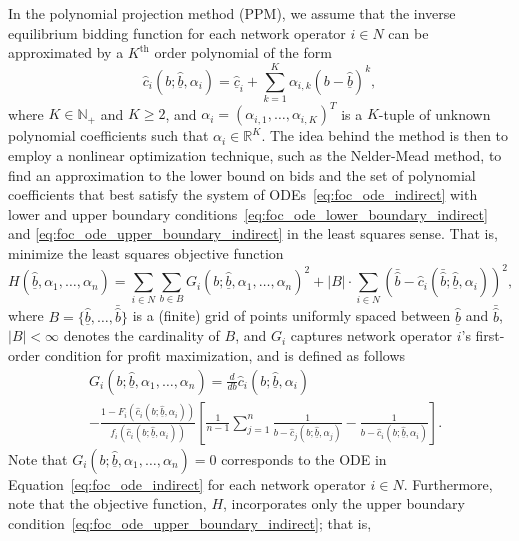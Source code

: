 In the polynomial projection method (PPM), we assume that the inverse equilibrium bidding function for each network operator $i\in N$ can be approximated by a $K^{\text{th}}$ order polynomial of the form
\begin{equation}
  \label{eq:polynomial_cost_function_indirect}
  \hat{c}_i(b;\underline{\hat{b}}, \alpha_i) = \underline{\hat{c}}_i + \sum_{k=1}^K \alpha_{i,k}(b - \underline{\hat{b}})^k,
\end{equation}
where $K\in\mathbb{N}_+$ and $K\geq 2$, and $\alpha_i = (\alpha_{i,1},\dotsc,\alpha_{i,K})^T$ is a $K$-tuple of unknown polynomial coefficients such that $\alpha_i\in\mathbb{R}^{K}$. The idea behind the method is then to employ a nonlinear optimization technique, such as the Nelder-Mead method, to find an approximation to the lower bound on bids and the set of polynomial coefficients that best satisfy the system of ODEs~\eqref{eq:foc_ode_indirect} with lower and upper boundary conditions~\eqref{eq:foc_ode_lower_boundary_indirect} and \eqref{eq:foc_ode_upper_boundary_indirect} in the least squares sense. That is, minimize the least squares objective function
\begin{equation}
  \label{eq:least_squares_objective_function_indirect}
  H(\underline{\hat{b}}, \alpha_1,\dotsc,\alpha_n) = \sum_{i\in N}\sum_{b\in B}G_i(b; \underline{\hat{b}}, \alpha_1,\dotsc, \alpha_n)^2 + |B|\cdot\sum_{i\in N} (\bar{\hat{b}} - \hat{c}_i(\bar{\hat{b}}; \underline{\hat{b}}, \alpha_i))^2,
\end{equation}
where $B=\{\underline{\hat{b}},\dotsc,\bar{\hat{b}}\}$ is a (finite) grid of points uniformly spaced between $\underline{\hat{b}}$ and $\bar{\hat{b}}$, $|B| < \infty$ denotes the cardinality of $B$, and $G_i$ captures network operator $i$'s first-order condition for profit maximization, and is defined as follows
\begin{align*}
  &G_i(b; \underline{\hat{b}}, \alpha_1, \dotsc, \alpha_n) = \displaystyle\frac{d}{db}\hat{c}_i(b;\underline{\hat{b}}, \alpha_i)\\
  &- \displaystyle\frac{1 - F_i(\hat{c}_i(b;\underline{\hat{b}}, \alpha_i))}{f_i(\hat{c}_i(b;\underline{\hat{b}}, \alpha_i))}\left[ \frac{1}{n-1}\sum_{j=1}^n\frac{1}{b - \hat{c}_j(b;\underline{\hat{b}}, \alpha_j)} - \frac{1}{b - \hat{c}_i(b;\underline{\hat{b}}, \alpha_i)} \right].
\end{align*}
Note that $G_i(b; \underline{\hat{b}}, \alpha_1,\dotsc, \alpha_n) = 0$ corresponds to the ODE in Equation~\eqref{eq:foc_ode_indirect} for each network operator $i\in N$. Furthermore, note that the objective function, $H$, incorporates only the upper boundary condition~\eqref{eq:foc_ode_upper_boundary_indirect}; that is,
